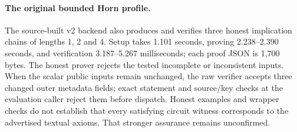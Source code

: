 \paragraph{The original bounded Horn profile.}
The source-built v2 backend also produces and verifies three honest implication
chains of lengths 1, 2 and 4. Setup takes 1.101 seconds, proving
2.238--2.390 seconds, and verification
3.187--5.267 milliseconds; each proof JSON is 1,700 bytes.
The honest prover rejects the tested incomplete or inconsistent inputs.
When the scalar public inputs remain unchanged, the raw verifier accepts three
changed outer metadata fields; exact statement and source/key checks at the
evaluation caller reject them before dispatch. Honest examples and wrapper
checks do not establish that every satisfying circuit witness corresponds to
the advertised textual axioms. That stronger assurance remains unconfirmed.

